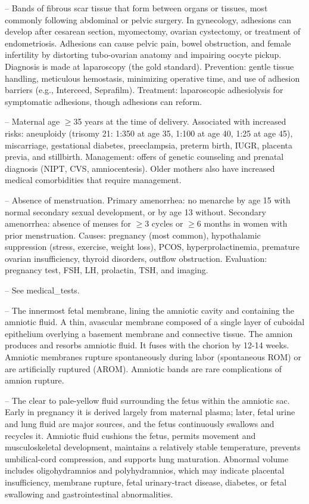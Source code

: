 -- Bands of fibrous scar tissue that form between organs or tissues, most commonly following abdominal or pelvic surgery. In gynecology, adhesions can develop after cesarean section, myomectomy, ovarian cystectomy, or treatment of endometriosis. Adhesions can cause pelvic pain, bowel obstruction, and female infertility by distorting tubo-ovarian anatomy and impairing oocyte pickup. Diagnosis is made at laparoscopy (the gold standard). Prevention: gentle tissue handling, meticulous hemostasis, minimizing operative time, and use of adhesion barriers (e.g., Interceed, Seprafilm). Treatment: laparoscopic adhesiolysis for symptomatic adhesions, though adhesions can reform.

-- Maternal age \(\ge\)35 years at the time of delivery. Associated with increased risks: aneuploidy (trisomy 21: 1:350 at age 35, 1:100 at age 40, 1:25 at age 45), miscarriage, gestational diabetes, preeclampsia, preterm birth, IUGR, placenta previa, and stillbirth. Management: offers of genetic counseling and prenatal diagnosis (NIPT, CVS, amniocentesis). Older mothers also have increased medical comorbidities that require management.

-- Absence of menstruation. Primary amenorrhea: no menarche by age 15 with normal secondary sexual development, or by age 13 without. Secondary amenorrhea: absence of menses for \(\ge\)3 cycles or \(\ge\)6 months in women with prior menstruation. Causes: pregnancy (most common), hypothalamic suppression (stress, exercise, weight loss), PCOS, hyperprolactinemia, premature ovarian insufficiency, thyroid disorders, outflow obstruction. Evaluation: pregnancy test, FSH, LH, prolactin, TSH, and imaging.

-- See medical\_tests.

-- The innermost fetal membrane, lining the amniotic cavity and containing the amniotic fluid. A thin, avascular membrane composed of a single layer of cuboidal epithelium overlying a basement membrane and connective tissue. The amnion produces and resorbs amniotic fluid. It fuses with the chorion by 12-14 weeks. Amniotic membranes rupture spontaneously during labor (spontaneous ROM) or are artificially ruptured (AROM). Amniotic bands are rare complications of amnion rupture.

-- The clear to pale-yellow fluid surrounding the fetus within the amniotic sac. Early in pregnancy it is derived largely from maternal plasma; later, fetal urine and lung fluid are major sources, and the fetus continuously swallows and recycles it. Amniotic fluid cushions the fetus, permits movement and musculoskeletal development, maintains a relatively stable temperature, prevents umbilical-cord compression, and supports lung maturation. Abnormal volume includes oligohydramnios and polyhydramnios, which may indicate placental insufficiency, membrane rupture, fetal urinary-tract disease, diabetes, or fetal swallowing and gastrointestinal abnormalities.

